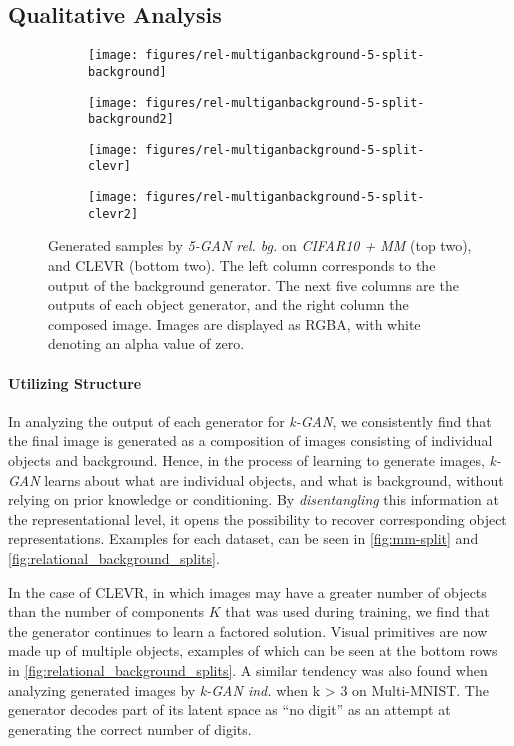 \documentclass{article}
\begin{document}
\subsection{Qualitative Analysis}\begin{figure}
\centering
\begin{subfigure}[b]{\textwidth}
  \texttt{[image: figures/rel-multiganbackground-5-split-background]}
\end{subfigure}
\begin{subfigure}[b]{\textwidth}
  \texttt{[image: figures/rel-multiganbackground-5-split-background2]}
\end{subfigure}
\begin{subfigure}[b]{\textwidth}
  \texttt{[image: figures/rel-multiganbackground-5-split-clevr]}
\end{subfigure}
\begin{subfigure}[b]{\textwidth}
  \texttt{[image: figures/rel-multiganbackground-5-split-clevr2]}
\end{subfigure}
\caption{Generated samples by \emph{5-GAN rel. bg.} on \emph{CIFAR10 + MM} (top two), and CLEVR (bottom two). The left column corresponds to the output of the background generator. The next five columns are the outputs of each object generator, and the right column the composed image. Images are displayed as RGBA, with white denoting an alpha value of zero.}
\label{fig:relational_background_splits}
\end{figure}\paragraph{Utilizing Structure}
In analyzing the output of each generator for \emph{k-GAN}, we consistently find that the final image is generated as a composition of images consisting of individual objects and background.
Hence, in the process of learning to generate images, \emph{k-GAN} learns about what are individual objects, and what is background, without relying on prior knowledge or conditioning.
By \emph{disentangling} this information at the representational level, it opens the possibility to recover corresponding object representations.
Examples for each dataset, can be seen in \autoref{fig:mm-split} and \autoref{fig:relational_background_splits}.

In the case of CLEVR, in which images may have a greater number of objects than the number of components $K$ that was used during training, we find that the generator continues to learn a factored solution.
Visual primitives are now made up of multiple objects, examples of which can be seen at the bottom rows in \autoref{fig:relational_background_splits}.
A similar tendency was also found when analyzing generated images by \emph{k-GAN ind.} when k > 3 on Multi-MNIST.
The generator decodes part of its latent space as ``no digit'' as an attempt at generating the correct number of digits.
\end{document}
